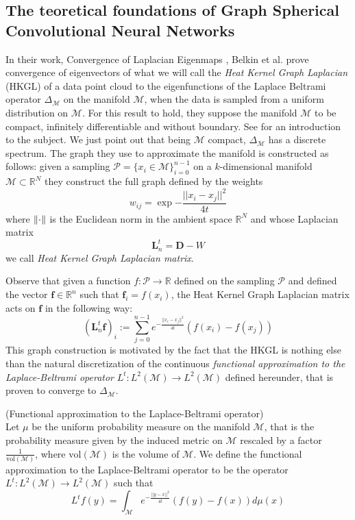 \subsection{The teoretical foundations of Graph Spherical Convolutional Neural Networks}\label{sec:Chapter1:theoretical foundations}
In their work, Convergence of Laplacian Eigenmaps \cite{NIPS2006_2989}, Belkin et al. prove convergence of eigenvectors of what we will call the \textit{Heat Kernel Graph Laplacian} (HKGL) of a data point cloud to the eigenfunctions of the Laplace Beltrami operator $\Delta_\mathcal M$ on the manifold $\mathcal M$, when the data is sampled from a uniform distribution on $\mathcal M$.
For this result to hold, they suppose the manifold $\mathcal M$ to be compact, infinitely differentiable and without boundary. See \cite{rosenberg_1997} for an introduction to the subject. We just point out that being $\mathcal M$ compact, $\Delta_\mathcal M$ has a discrete spectrum. The graph they use to approximate the manifold is constructed as follows: given a sampling $ \mathcal P = \{x_i\in\mathcal M\}_{i=0}^{n-1}$ on a $k$-dimensional manifold $\mathcal M\subset \mathbb R^N$ they construct the full graph defined by the weights 
	$$
	w_{ij}=\exp{-\frac{||x_i-x_j||^2}{4t}}
	$$
	where $\left\lVert\cdot\right\rVert$ is the Euclidean norm in the ambient space $\mathbb R^N$ and whose Laplacian matrix 
	$$
	\mathbf L_n^t = \mathbf D-W
	$$ we call \textit{Heat Kernel Graph Laplacian matrix}.
	
Observe that given a function $f: \mathcal P \rightarrow \mathbb R$ defined on the sampling $ \mathcal P$ and defined the vector $\mathbf f\in\mathbb R^n$ such that $\mathbf f_i = f(x_i)$, the Heat Kernel Graph Laplacian matrix acts on $\mathbf f$ in the following way:
\begin{equation}\label{eq:HKGL}
	(\mathbf L_n^t \mathbf f)_i:=  \sum_{j=0}^{n-1} e^{-\frac{||x_i-x_j||^2}{4t}}\left(f(x_i)-f(x_j)\right)
\end{equation}
This graph construction is motivated by the fact that the HKGL is nothing else than the natural discretization of the continuous \textit{functional approximation to the Laplace-Beltrami operator} $L^t:  L^{2}(\mathcal{M}) \rightarrow L^{2}(\mathcal{M})$ defined hereunder, that is proven to converge to $\Delta_\mathcal M$.
\vspace{0.5cm}
\begin{definition}{}(Functional approximation to the Laplace-Beltrami operator)\\ \label{eq: my L^t} Let $\mu$ be the uniform probability measure on the manifold $\mathcal M$, that is the probability measure given by the induced metric on $\mathcal M$ rescaled by a factor $\frac{1}{\text{vol}(\mathcal M)}$, where $\text{vol}(\mathcal M)$ is the volume of $\mathcal M$. We define the functional approximation to the Laplace-Beltrami operator to be the operator $L^t: L^{2}(\mathcal{M}) \rightarrow L^{2}(\mathcal{M})$ such that
	\label{def:Functional approximation to the Laplace-Beltrami operator}
	$$ L^tf(y) = \int_{\mathcal M}e^{-\frac{||y-x||^2}{4t}}\left(f(y)-f(x)\right)d\mu(x)$$
\end{definition}
\vspace{0.5cm}


